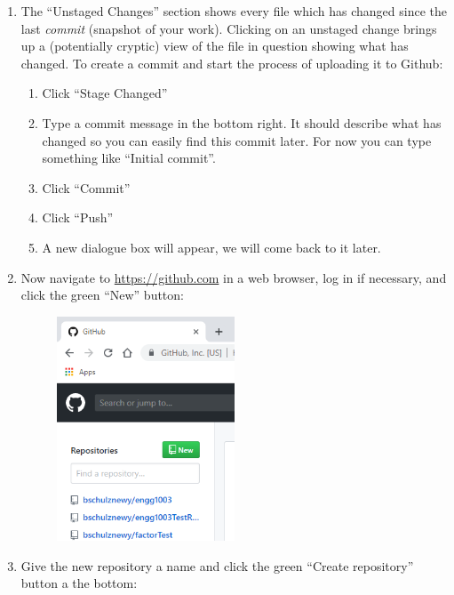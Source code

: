 \documentclass{lab}
\begin{document}
\begin{task}{}{}
\begin{enumerate}
\item The ``Unstaged Changes'' section shows every file which has changed since the last \textit{commit} (snapshot of your work). Clicking on an unstaged change brings up a (potentially cryptic) view of the file in question showing what has changed. To create a commit and start the process of uploading it to Github:

\begin{enumerate}
	\item Click ``Stage Changed''
	\item Type a commit message in the bottom right. It should describe what has changed so you can easily find this commit later. For now you can type something like ``Initial commit''.
	\item Click ``Commit''
	\item Click ``Push''
	\item A new dialogue box will appear, we will come back to it later.
\end{enumerate}

\item Now navigate to \url{https://github.com} in a web browser, log in if necessary, and click the green ``New'' button:

\begin{figure}[H]
\begin{center}
\includegraphics[width=0.5\textwidth]{Wk1Images/git5a}
\end{center}
\end{figure}

\pagebreak

\item Give the new repository a name and click the green ``Create repository'' button a the bottom:


\end{enumerate}
\end{task}
\end{document}
